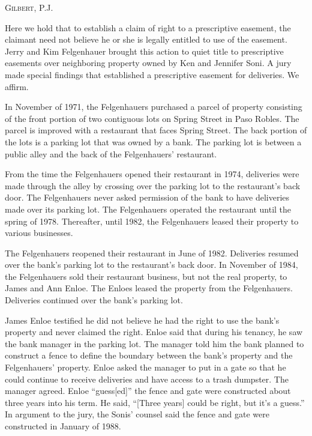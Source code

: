 

\opinion \textsc{Gilbert}, P.J.

Here we hold that to establish a claim of right to a prescriptive easement, the
claimant need not believe he or she is legally entitled to use of the easement.
Jerry and Kim Felgenhauer brought this action to quiet title to prescriptive
easements over neighboring property owned by Ken and Jennifer Soni. A jury made
special findings that established a prescriptive easement for deliveries. We
affirm.


In November of 1971, the Felgenhauers purchased a parcel of property consisting
of the front portion of two contiguous lots on Spring Street in Paso Robles. The
parcel is improved with a restaurant that faces Spring Street. The back portion
of the lots is a parking lot that was owned by a bank. The parking lot is
between a public alley and the back of the Felgenhauers' restaurant.

From the time the Felgenhauers opened their restaurant in 1974, deliveries were
made through the alley by crossing over the parking lot to the restaurant's back
door. The Felgenhauers never asked permission of the bank to have deliveries
made over its parking lot. The Felgenhauers operated the restaurant until the
spring of 1978. Thereafter, until 1982, the Felgenhauers leased their property
to various businesses.

The Felgenhauers reopened their restaurant in June of 1982. Deliveries resumed
over the bank's parking lot to the restaurant's back door. In November of 1984,
the Felgenhauers sold their restaurant business, but not the real property, to
James and Ann Enloe. The Enloes leased the property from the Felgenhauers.
Deliveries continued over the bank's parking lot.

James Enloe testified he did not believe he had the right to use the bank's
property and never claimed the right. Enloe said that during his tenancy, he saw
the bank manager in the parking lot. The manager told him the bank planned to
construct a fence to define the boundary between the bank's property and the
Felgenhauers' property. Enloe asked the manager to put in a gate so that he
could continue to receive deliveries and have access to a trash dumpster. The
manager agreed. Enloe ``guess[ed]'' the fence and gate were constructed about
three years into his term. He said, ``[Three years] could be right, but it's a
guess.'' In argument to the jury, the Sonis' counsel said the fence and gate
were constructed in January of 1988.

